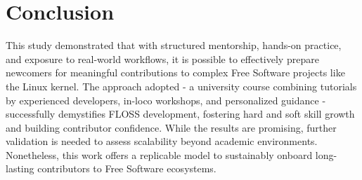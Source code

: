 \section{Conclusion}

This study demonstrated that with structured mentorship, hands-on practice, and
exposure to real-world workflows, it is possible to effectively prepare
newcomers for meaningful contributions to complex Free Software projects like
the Linux kernel. The approach adopted - a university course combining tutorials
by experienced developers, in-loco workshops, and personalized guidance -
successfully demystifies FLOSS development, fostering hard and soft skill growth
and building contributor confidence. While the results are promising, further
validation is needed to assess scalability beyond academic environments.
Nonetheless, this work offers a replicable model to sustainably onboard
long-lasting contributors to Free Software ecosystems.
